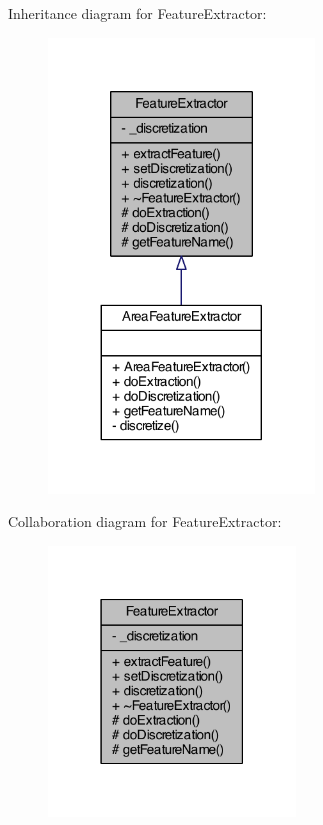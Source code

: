 Inheritance diagram for Feature\+Extractor\+:\nopagebreak
\begin{figure}[H]
\begin{center}
\leavevmode
\includegraphics[width=200pt]{class_feature_extractor__inherit__graph}
\end{center}
\end{figure}


Collaboration diagram for Feature\+Extractor\+:\nopagebreak
\begin{figure}[H]
\begin{center}
\leavevmode
\includegraphics[width=186pt]{class_feature_extractor__coll__graph}
\end{center}
\end{figure}


